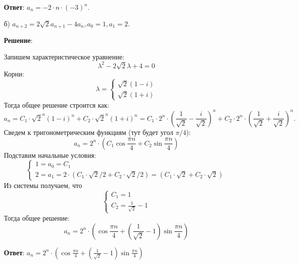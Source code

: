 \documentclass{article}
\begin{document}
\begin{enumerate}
    \textbf{Ответ}:
    $a_n = -2 \cdot n \cdot (-3)^n.$
    
    б) $a_{n+2} = 2\sqrt{2}a_{n+1} - 4a_n, a_0 = 1, a_1 = 2.$

    \textbf{Решение}:

    Запишем характеристическое уравнение:
    \begin{equation}
      \lambda^2 - 2\sqrt{2} \lambda + 4 = 0
    \end{equation}
    Корни:
    \begin{equation}
      \lambda = \begin{cases}
        \sqrt{2} (1-i) \\
        \sqrt{2} (1+i)
      \end{cases}
    \end{equation}
    Тогда общее решение строится как:
    \begin{equation}
      a_n = C_1 \cdot \sqrt{2}^n (1-i)^n + C_2 \cdot \sqrt{2}^n (1+i)^n = C_1 \cdot 2^n \cdot \left(\frac{1}{\sqrt{2}}-\frac{i}{\sqrt{2}}\right)^n + C_2 \cdot 2^n \cdot \left(\frac{1}{\sqrt{2}}+\frac{i}{\sqrt{2}}\right)^n.
    \end{equation}
    Сведем к тригонометрическим функциям (тут будет угол $\pi/4$):
    \begin{equation}
      a_n = 2^n \cdot \left(C_1 \cos \frac{\pi n}{4} + C_2 \sin \frac{\pi n}{4}\right)
    \end{equation}
    Подставим начальные условия:
    \begin{equation}
      \begin{cases}
        1 = a_0 = C_1 \\
        2 = a_1 = 2 \cdot (C_1 \cdot \sqrt{2}/2 + C_2 \cdot \sqrt{2}/2) = (C_1 \cdot \sqrt{2} + C_2 \cdot \sqrt{2})
      \end{cases}
    \end{equation}
    Из системы получаем, что
    \begin{equation}
      \begin{cases}
        C_1 = 1 \\
        C_2 = \frac{1}{\sqrt{2}} - 1
      \end{cases}
    \end{equation}
    Тогда общее решение:
    \begin{equation}
      a_n = 2^n \cdot \left(\cos \frac{\pi n}{4} + \left(\frac{1}{\sqrt{2}} - 1\right) \sin \frac{\pi n}{4}\right)
    \end{equation}

    \textbf{Ответ}:
    $a_n = 2^n \cdot \left(\cos \frac{\pi n}{4} + \left(\frac{1}{\sqrt{2}} - 1\right) \sin \frac{\pi n}{4}\right)$


\end{enumerate}
\end{document}
